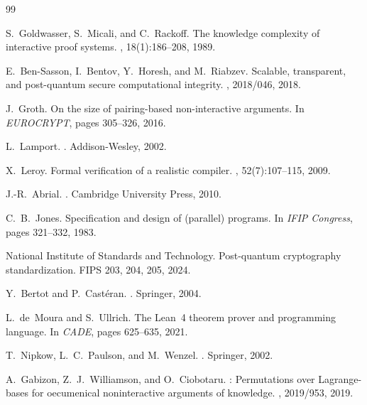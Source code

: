 \documentclass[11pt,a4paper]{article}
\theoremstyle{definition}
\begin{document}
\begin{thebibliography}{99}

S.~Goldwasser, S.~Micali, and C.~Rackoff.
\newblock The knowledge complexity of interactive proof systems.
, 18(1):186--208, 1989.

E.~Ben-Sasson, I.~Bentov, Y.~Horesh, and M.~Riabzev.
\newblock Scalable, transparent, and post-quantum secure computational integrity.
, 2018/046, 2018.

J.~Groth.
\newblock On the size of pairing-based non-interactive arguments.
\newblock In {\em EUROCRYPT}, pages 305--326, 2016.

L.~Lamport.
.
\newblock Addison-Wesley, 2002.

X.~Leroy.
\newblock Formal verification of a realistic compiler.
, 52(7):107--115, 2009.

J.-R.~Abrial.
.
\newblock Cambridge University Press, 2010.

C.~B.~Jones.
\newblock Specification and design of (parallel) programs.
\newblock In {\em IFIP Congress}, pages 321--332, 1983.

National Institute of Standards and Technology.
\newblock Post-quantum cryptography standardization.
\newblock FIPS 203, 204, 205, 2024.

Y.~Bertot and P.~Cast\'{e}ran.
.
\newblock Springer, 2004.

L.~de~Moura and S.~Ullrich.
\newblock The {Lean}~4 theorem prover and programming language.
\newblock In {\em CADE}, pages 625--635, 2021.

T.~Nipkow, L.~C.~Paulson, and M.~Wenzel.
.
\newblock Springer, 2002.

A.~Gabizon, Z.~J.~Williamson, and O.~Ciobotaru.
: Permutations over {Lagrange}-bases for oecumenical noninteractive arguments of knowledge.
, 2019/953, 2019.


\end{thebibliography}
\end{document}
